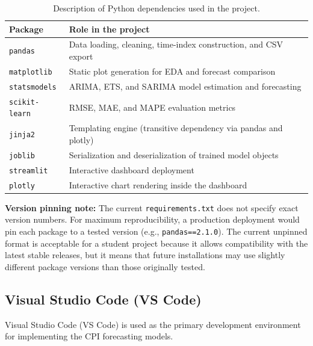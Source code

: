 \begin{table}[htbp]
	\centering
	\caption{Description of Python dependencies used in the project.}
	\label{tab:dependency-descriptions}
	\begin{tabular}{p{2.5cm}p{10.5cm}}
		\hline
		\textbf{Package} & \textbf{Role in the project} \\
		\hline
		\texttt{pandas} & Data loading, cleaning, time-index construction, and CSV export \\
		\texttt{matplotlib} & Static plot generation for EDA and forecast comparison \\
		\texttt{statsmodels} & ARIMA, ETS, and SARIMA model estimation and forecasting \\
		\texttt{scikit-learn} & RMSE, MAE, and MAPE evaluation metrics \\
		\texttt{jinja2} & Templating engine (transitive dependency via pandas and plotly) \\
		\texttt{joblib} & Serialization and deserialization of trained model objects \\
		\texttt{streamlit} & Interactive dashboard deployment \\
		\texttt{plotly} & Interactive chart rendering inside the dashboard \\
		\hline
	\end{tabular}
\end{table}

\textbf{Version pinning note:} The current \texttt{requirements.txt} does not specify exact version numbers. For maximum reproducibility, a production deployment would pin each package to a tested version (e.g., \texttt{pandas==2.1.0}). The current unpinned format is acceptable for a student project because it allows compatibility with the latest stable releases, but it means that future installations may use slightly different package versions than those originally tested.

\subsection{Visual Studio Code (VS Code)}

Visual Studio Code (VS Code) is used as the primary development environment for implementing the CPI forecasting models.

